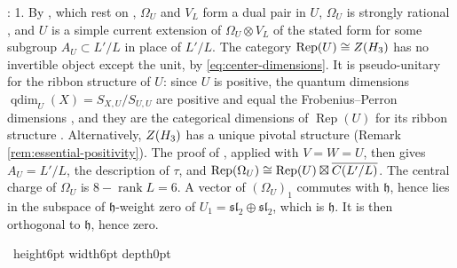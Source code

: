 \documentclass[leqno]{article}
\let\cal\relax
\newcommand{\cal}{\mathcal}
\newcommand{\qed}{\hfill \vrule height6pt  width6pt depth0pt}
\newcommand{\ot}{\otimes}
\DeclareMathOperator{\Rep}{Rep}
\newenvironment{proof}[1][]{\noindent {\it Proof #1} : }{\hbox{~}\qed
\smallskip
}
\numberwithin{equation}{section}
\begin{document}
\begin{proof}
1. By \cite[Definition 2.12, Proposition 2.14]{MoR24a}, which rest on \cite{Mas14}, $\Omega_U$ and $V_L$ form a dual pair in $U$, $\Omega_U$ is strongly rational \cite{CKLR19}, and $U$ is a simple current extension of $\Omega_U \ot V_L$ of the stated form for some subgroup $A_U \subset L'/L$ in place of $L'/L$. The category $\Rep(U) \cong Z(\cal H_3)$ has no invertible object except the unit, by \eqref{eq:center-dimensions}. It is pseudo-unitary for the ribbon structure of $U$: since $U$ is positive, the quantum dimensions $\operatorname{qdim}_U(X) = S_{X,U}/S_{U,U}$ are positive and equal the Frobenius--Perron dimensions \cite{DJX13}, and they are the categorical dimensions of $\Rep(U)$ for its ribbon structure \cite{Hua08}. Alternatively, $Z(\cal H_3)$ has a unique pivotal structure (Remark \ref{rem:essential-positivity}). The proof of \cite[Corollary 4.10]{MoR24a}, applied with $V = W = U$, then gives $A_U = L'/L$, the description of $\tau$, and $\Rep(\Omega_U) \cong \Rep(U) \boxtimes \overline{\cal C(L'/L)}$. The central charge of $\Omega_U$ is $8-\operatorname{rank}L = 6$. A vector of $(\Omega_U)_1$ commutes with $\mathfrak h$, hence lies in the subspace of $\mathfrak h$-weight zero of $U_1 = \mathfrak{sl}_2 \oplus \mathfrak{sl}_2$, which is $\mathfrak h$. It is then orthogonal to $\mathfrak h$, hence zero.


\end{proof}
\end{document}
